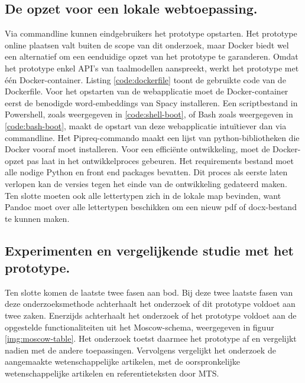 \subsection{De opzet voor een lokale webtoepassing.}

Via commandline kunnen eindgebruikers het prototype opstarten. Het prototype online plaatsen valt buiten de scope van dit onderzoek, maar Docker biedt wel een alternatief om een eenduidige opzet van het prototype te garanderen. Omdat het prototype enkel API's van taalmodellen aanspreekt, werkt het prototype met één Docker-container. Listing \ref{code:dockerfile} toont de gebruikte code van de Dockerfile. Voor het opstarten van de webapplicatie moet de Docker-container eerst de benodigde word-embeddings van Spacy installeren. Een scriptbestand in Powershell, zoals weergegeven in \ref{code:shell-boot}, of Bash zoals weergegeven in \ref{code:bash-boot}, maakt de opstart van deze webapplicatie intuïtiever dan via commandline. Het Pipreq-commando maakt een lijst van python-bibliotheken die Docker vooraf moet installeren. Voor een efficiënte ontwikkeling, moet de Docker-opzet pas laat in het ontwikkelproces gebeuren. Het requirements bestand moet alle nodige Python en front end packages bevatten. Dit proces als eerste laten verlopen kan de versies tegen het einde van de ontwikkeling gedateerd maken. Ten slotte moeten ook alle lettertypen zich in de lokale map bevinden, want Pandoc moet over alle lettertypen beschikken om een nieuw pdf of docx-bestand te kunnen maken.

\subsection{Experimenten en vergelijkende studie met het prototype.}

Ten slotte komen de laatste twee fasen aan bod. Bij deze twee laatste fasen van deze onderzoeksmethode achterhaalt het onderzoek of dit prototype voldoet aan twee zaken. Enerzijds achterhaalt het onderzoek of het prototype voldoet aan de opgestelde functionaliteiten uit het Moscow-schema, weergegeven in figuur \ref{img:moscow-table}. Het onderzoek toetst daarmee het prototype af en vergelijkt nadien met de andere toepassingen. Vervolgens vergelijkt het onderzoek de aangemaakte wetenschappelijke artikelen, met de oorspronkelijke wetenschappelijke artikelen en referentieteksten door MTS.